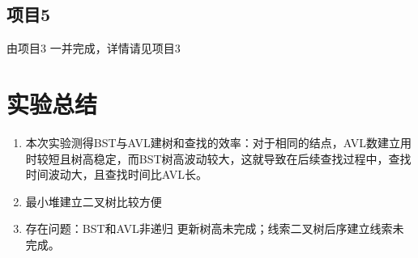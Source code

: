 \subsection{项目5}
由项目3 一并完成，详情请见项目3


\section{实验总结}
\begin{enumerate}
\item 本次实验测得BST与AVL建树和查找的效率：对于相同的结点，AVL数建立用时较短且树高稳定，而BST树高波动较大，这就导致在后续查找过程中，查找时间波动大，且查找时间比AVL长。
\item 最小堆建立二叉树比较方便
\item 存在问题：BST和AVL非递归 更新树高未完成；线索二叉树后序建立线索未完成。
\end{enumerate}


